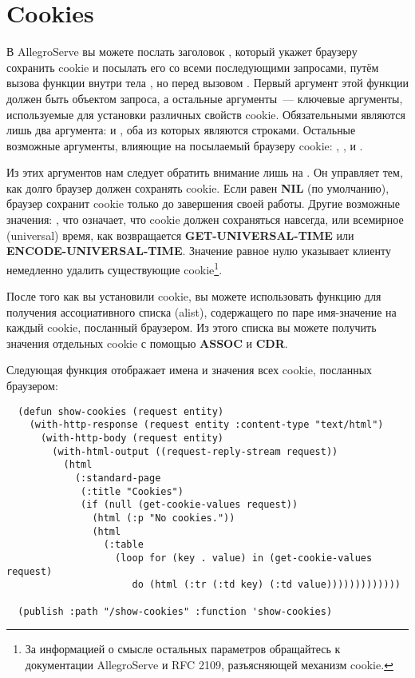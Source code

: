\section{Cookies}

В AllegroServe вы можете послать заголовок , который укажет браузеру
сохранить cookie и посылать его со всеми последующими запросами, путём вызова функции
 внутри тела , но перед вызовом
. Первый аргумент этой функции должен быть объектом запроса, а
остальные аргументы~--- ключевые аргументы, используемые для установки различных свойств
cookie. Обязательными являются лишь два аргумента:  и , оба из
которых являются строками. Остальные возможные аргументы, влияющие на посылаемый браузеру
cookie: , ,  и .

Из этих аргументов нам следует обратить внимание лишь на . Он управляет
тем, как долго браузер должен сохранять cookie. Если  равен \textbf{NIL}
(по умолчанию), браузер сохранит cookie только до завершения своей работы. Другие
возможные значения: , что означает, что cookie должен сохраняться навсегда,
или всемирное (universal) время, как возвращается \textbf{GET-UNIVERSAL-TIME} или
\textbf{ENCODE-UNIVERSAL-TIME}. Значение  равное нулю указывает клиенту
немедленно удалить существующие cookie\footnote{За информацией о смысле остальных
  параметров обращайтесь к документации AllegroServe и RFC 2109, разъясняющей механизм
  cookie.}.

После того как вы установили cookie, вы можете использовать функцию
 для получения ассоциативного списка (alist), содержащего по паре
имя-значение на каждый cookie, посланный браузером. Из этого списка вы можете получить
значения отдельных cookie с помощью \textbf{ASSOC} и \textbf{CDR}.

Следующая функция отображает имена и значения всех cookie, посланных браузером:

\begin{lstlisting}
  (defun show-cookies (request entity)
    (with-http-response (request entity :content-type "text/html")
      (with-http-body (request entity)
        (with-html-output ((request-reply-stream request))
          (html
            (:standard-page
             (:title "Cookies")
             (if (null (get-cookie-values request))
               (html (:p "No cookies."))
               (html 
                 (:table
                   (loop for (key . value) in (get-cookie-values request)
                      do (html (:tr (:td key) (:td value)))))))))))))

  (publish :path "/show-cookies" :function 'show-cookies)
\end{lstlisting}

